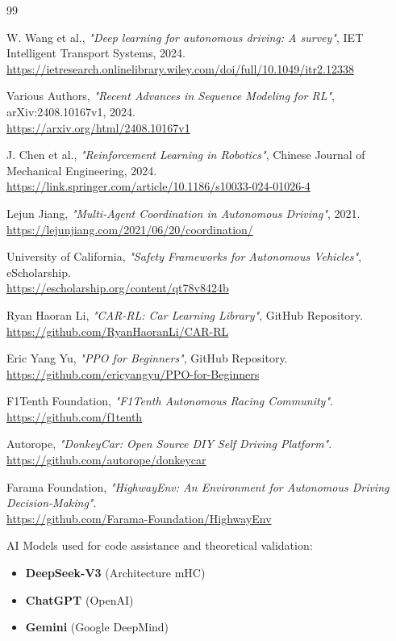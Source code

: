 \documentclass[12pt]{article}
\theoremstyle{definition}
\begin{document}
\begin{thebibliography}{99}

W. Wang et al., \textit{"Deep learning for autonomous driving: A survey"}, IET Intelligent Transport Systems, 2024. \\
\url{https://ietresearch.onlinelibrary.wiley.com/doi/full/10.1049/itr2.12338}

Various Authors, \textit{"Recent Advances in Sequence Modeling for RL"}, arXiv:2408.10167v1, 2024. \\
\url{https://arxiv.org/html/2408.10167v1}

J. Chen et al., \textit{"Reinforcement Learning in Robotics"}, Chinese Journal of Mechanical Engineering, 2024. \\
\url{https://link.springer.com/article/10.1186/s10033-024-01026-4}

Lejun Jiang, \textit{"Multi-Agent Coordination in Autonomous Driving"}, 2021. \\
\url{https://lejunjiang.com/2021/06/20/coordination/}

University of California, \textit{"Safety Frameworks for Autonomous Vehicles"}, eScholarship. \\
\url{https://escholarship.org/content/qt78v8424b}

Ryan Haoran Li, \textit{"CAR-RL: Car Learning Library"}, GitHub Repository. \\
\url{https://github.com/RyanHaoranLi/CAR-RL}

Eric Yang Yu, \textit{"PPO for Beginners"}, GitHub Repository. \\
\url{https://github.com/ericyangyu/PPO-for-Beginners}

F1Tenth Foundation, \textit{"F1Tenth Autonomous Racing Community"}. \\
\url{https://github.com/f1tenth}

Autorope, \textit{"DonkeyCar: Open Source DIY Self Driving Platform"}. \\
\url{https://github.com/autorope/donkeycar}

Farama Foundation, \textit{"HighwayEnv: An Environment for Autonomous Driving Decision-Making"}. \\
\url{https://github.com/Farama-Foundation/HighwayEnv}

AI Models used for code assistance and theoretical validation:
\begin{itemize}
    \item \textbf{DeepSeek-V3} (Architecture mHC)
    \item \textbf{ChatGPT} (OpenAI)
    \item \textbf{Gemini} (Google DeepMind)
\end{itemize}

\end{thebibliography}
\end{document}
